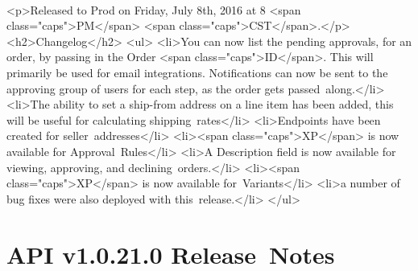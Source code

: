 \documentclass{memoir}%
\begin{document}
\paragraph*{}%
<p>Released to Prod on Friday, July 8th, 2016 at 8 <span class="caps">PM</span> <span class="caps">CST</span>.</p>\newline%
<h2>Changelog</h2>\newline%
<ul>\newline%
<li>You can now list the pending approvals, for an order, by passing in the Order <span class="caps">ID</span>. This will primarily be used for email integrations. Notifications can now be sent to the approving group of users for each step, as the order gets passed~along.</li>\newline%
<li>The ability to set a ship{-}from address on a line item has been added, this will be useful for calculating shipping~rates</li>\newline%
<li>Endpoints have been created for seller~addresses</li>\newline%
<li><span class="caps">XP</span> is now available for Approval~Rules</li>\newline%
<li>A Description field is now available for viewing, approving, and declining~orders.</li>\newline%
<li><span class="caps">XP</span> is now available for~Variants</li>\newline%
<li>a number of bug fixes were also deployed with this~release.</li>\newline%
</ul>

%
\section*{API v1.0.21.0 Release~Notes}%
\paragraph*{}%

%
\end{document}
